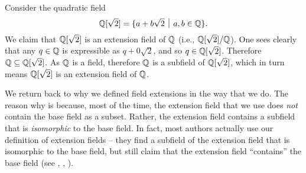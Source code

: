 \begin{example}
    Consider the quadratic field
    \[
        \Q[\sqrt{2}] = \{a + b\sqrt{2} \vert a,b\in\Q\}.
    \]
    We claim that $\mathbb{Q}[\sqrt{2}]$ is an extension field of $\mathbb{Q}$ (i.e., $\mathbb{Q}[\sqrt{2}]/\mathbb{Q}$). One sees clearly that any $q \in \mathbb{Q}$ is expressible as $q + 0\sqrt{2}$, and so $q \in \mathbb{Q}[\sqrt2]$. Therefore $\mathbb{Q} \subseteq \mathbb{Q}[\sqrt2]$. As $\mathbb{Q}$ is a field, therefore $\mathbb{Q}$ is a subfield of $\mathbb{Q}[\sqrt2]$, which in turn means $\mathbb{Q}[\sqrt2]$ is an extension field of $\mathbb{Q}$.
\end{example}

We return back to why we defined field extensions in the way that we do. The reason why is because, most of the time, the extension field that we use does \textit{not} contain the base field as a subset. Rather, the extension field contains a subfield that is \textit{isomorphic} to the base field. In fact, most authors actually use our definition of extension fields -- they find a subfield of the extension field that is isomorphic to the base field, but still claim that the extension field ``contains'' the base field (see \cite[Theorem 13.1.3]{dummit_foote_2004}, \cite[p.~339, Proof]{gallian_2016}, \cite[Example 21.2]{judson_beezer_2022}).

